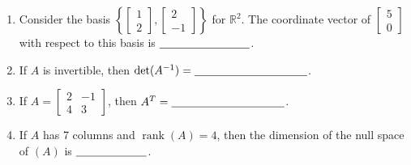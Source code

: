 \documentclass[11pt,a4paper]{article}
\begin{document}
\begin{enumerate}[label=\arabic*.]
  \item Consider the basis
        $\left\{\begin{bmatrix}1\\2\end{bmatrix},
        \begin{bmatrix}2\\-1\end{bmatrix}\right\}$ for $\mathbb R^{2}$.
        The coordinate vector of $\begin{bmatrix}5\\0\end{bmatrix}$ with respect to this basis is
        $\underline{\hspace{28mm}}$.
  \item If $A$ is invertible, then $\det(A^{-1})=\underline{\hspace{35mm}}$.
  \item If $A=\begin{bmatrix}2&-1\\4&3\end{bmatrix}$, then
        $A^{T}=\underline{\hspace{35mm}}$.
  \item If $A$ has 7 columns and $\operatorname{rank}(A)=4$, then
        the dimension of the null space of $(A)$ is $\underline{\hspace{22mm}}$.

\end{enumerate}
\end{document}
